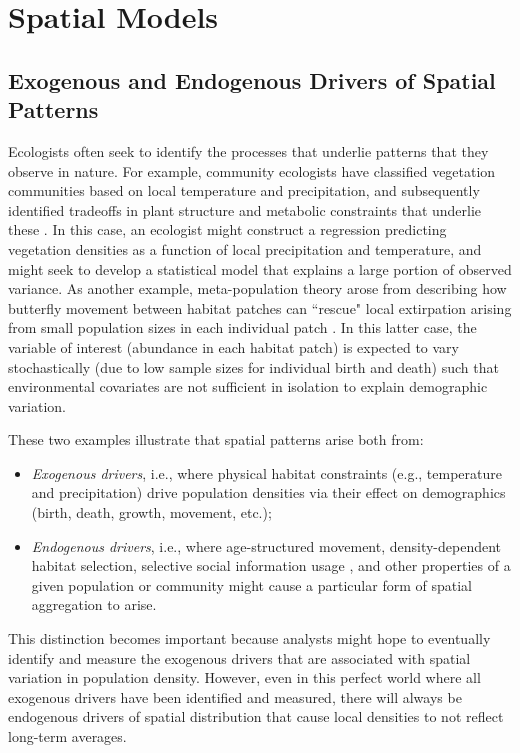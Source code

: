 \chapter{Spatial Models} \label{sec:Chap5}

\section{Exogenous and Endogenous Drivers of Spatial Patterns}
Ecologists often seek to identify the processes that underlie patterns that they observe in nature.  For example, community ecologists have classified vegetation communities based on local temperature and precipitation, and subsequently identified tradeoffs in plant structure and metabolic constraints that underlie these \cite{ricklefs_economy_2008}.  In this case, an ecologist might construct a regression predicting vegetation densities as a function of local precipitation and temperature, and might seek to develop a statistical model that explains a large portion of observed variance.  As another example, meta-population theory arose from describing how butterfly movement between habitat patches can ``rescue" local extirpation arising from small population sizes in each individual patch \cite{hanski_checkerspots_2004}.  In this latter case, the variable of interest (abundance in each habitat patch) is expected to vary stochastically (due to low sample sizes for individual birth and death) such that environmental covariates are not sufficient in isolation to explain demographic variation.  

These two examples illustrate that spatial patterns arise both from:
\begin{itemize}
    \item \textit{Exogenous drivers}, i.e., where physical habitat constraints (e.g., temperature and precipitation) drive population densities via their effect on demographics (birth, death, growth, movement, etc.);

    \item \textit{Endogenous drivers}, i.e., where age-structured movement, density-dependent habitat selection, selective social information usage \cite{loukola_observed_2013}, and other properties of a given population or community might cause a particular form of spatial aggregation to arise. 
\end{itemize}
This distinction becomes important because analysts might hope to eventually identify and measure the exogenous drivers that are associated with spatial variation in population density.  However, even in this perfect world where all exogenous drivers have been identified and measured, there will always be endogenous drivers of spatial distribution that cause local densities to not reflect long-term averages.  


